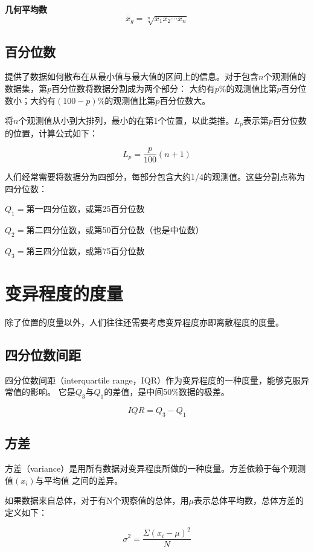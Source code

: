 \documentclass[a4paper]{ctexrep}
\begin{document}
\textbf{几何平均数}
\[\bar{x}_{g} = \sqrt[n]{x_{1}x_{2}\cdots x_{n}}\]

\subsection{百分位数}
提供了数据如何散布在从最小值与最大值的区间上的信息。对于包含$n$个观测值的数据集，第$p$百分位数将数据分割成为两个部分：
大约有$p\%$的观测值比第$p$百分位数小；大约有$(100-p)\%$的观测值比第$p$百分位数大。

将$n$个观测值从小到大排列，最小的在第1个位置，以此类推。$L_{p}$表示第$p$百分位数的位置，计算公式如下：
\begin{tcolorbox}[title = {第$p$百分位数位置}]
\[L_{p}=\frac{p}{100}(n+1)\]
\end{tcolorbox}

人们经常需要将数据分为四部分，每部分包含大约1/4的观测值。这些分割点称为四分位数：
\begin{tcolorbox}[title = {四分位数}]
$Q_{1}=$第一四分位数，或第25百分位数

$Q_{2}=$第二四分位数，或第50百分位数（也是中位数）

$Q_{3}=$第三四分位数，或第75百分位数
\end{tcolorbox}

\section{变异程度的度量}
除了位置的度量以外，人们往往还需要考虑变异程度亦即离散程度的度量。

\subsection{四分位数间距}
四分位数间距（interquartile range，IQR）作为变异程度的一种度量，能够克服异常值的影响。
它是$Q_{3}$与$Q_{1}$的差值，是中间50\%数据的极差。
\begin{tcolorbox}[title = {四分位数间距}]
\[IQR=Q_{3}-Q_{1}\]
\end{tcolorbox}

\subsection{方差}
方差（variance）是用所有数据对变异程度所做的一种度量。方差依赖于每个观测值$(x_{i})$与平均值
之间的差异。

如果数据来自总体，对于有N个观察值的总体，用$\mu$表示总体平均数，总体方差的定义如下：

\[\sigma^{2}=\frac{\Sigma(x_{i}-\mu)^{2}}{N}\]
\end{document}

